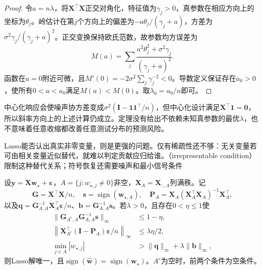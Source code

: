 \begin{proof}
令$a=n\lambda$，将$\bm{X}^{\top}\bm{X}$正交对角化，特征值为$\gamma_j>0$，真参数在相应方向上的坐标为$\theta_j$。岭估计在第$j$个方向上的偏差为$-a\theta_j/(\gamma_j+a)$，方差为$\sigma^2\gamma_j/(\gamma_j+a)^2$。正交变换保持欧氏范数，故参数均方误差为
\[
  M(a)=\sum_j\frac{a^2\theta_j^2+\sigma^2\gamma_j}{(\gamma_j+a)^2}.
\]
函数在$a=0$附近可微，且$M'(0)=-2\sigma^2\sum_j\gamma_j^{-2}<0$。导数定义保证存在$a_0>0$，使所有$0<a<a_0$满足$M(a)<M(0)$。取$\lambda_0=a_0/n$即可。
\end{proof}

中心化响应会使噪声协方差变成$\sigma^2(\bm{I}-\bm{1}\bm{1}^{\top}/n)$，但中心化设计满足$\bm{X}^{\top}\bm{1}=\bm{0}$，所以斜率方向上的上述计算仍成立。定理没有给出不依赖未知真参数的最优$\lambda$，也不意味着任意收缩都改善任意测试分布的预测风险。

Lasso能否认出真实非零变量，则是更强的问题。仅有稀疏性还不够：无关变量若可由相关变量近似替代，就难以判定贡献应归给谁。（irrepresentable condition）限制这种替代关系；符号恢复还需要噪声和最小信号条件

\begin{theorem}[Lasso的确定性符号恢复充分条件]
  \label{thm:regression-lasso-recovery}
  设$\bm{y}=\bm{X}\bm{w}_{\star}+\bm{\varepsilon}$，$A=\{j:w_{\star,j}\ne0\}$非空，$\bm{X}_A=\bm{X}_{:,A}$列满秩。记
  \[
    \bm{G}=\bm{X}^{\top}\bm{X}/n,\quad
    \bm{s}=\operatorname{sign}(\bm{w}_{\star,A}),\quad
    \bm{P}_A=\bm{X}_A(\bm{X}_A^{\top}\bm{X}_A)^{-1}\bm{X}_A^{\top},
  \]
  以及$\bm{q}=\bm{G}_{A,A}^{-1}\bm{X}_A^{\top}\bm{\varepsilon}/n$、$\bm{b}=\bm{G}_{A,A}^{-1}\bm{s}$。若$\lambda>0$，且存在$0<\eta\leq1$使
  \begin{align}
    \lVert\bm{G}_{A^c,A}\bm{G}_{A,A}^{-1}\bm{s}\rVert_\infty
      &\leq1-\eta, \label{eq:regression-irrepresentable}\\
    \left\lVert\bm{X}_{A^c}^{\top}(\bm{I}-\bm{P}_A)
                  \bm{\varepsilon}/n\right\rVert_\infty
      &\leq\lambda\eta/2, \label{eq:regression-lasso-noise}\\
    \min_{j\in A}|w_{\star,j}|
      &>\lVert\bm{q}\rVert_\infty+\lambda\lVert\bm{b}\rVert_\infty,
      \label{eq:regression-lasso-beta-min}
  \end{align}
  则Lasso解唯一，且$\operatorname{sign}(\widehat{\bm{w}})=\operatorname{sign}(\bm{w}_{\star})$。$A^c$为空时，前两个条件为空条件。
\end{theorem}

